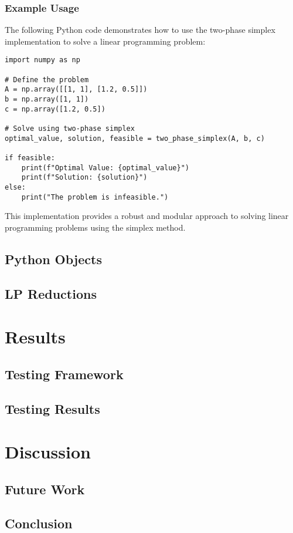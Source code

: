 \documentclass[conference]{IEEEtran}
\begin{document}
\subsubsection{Example Usage}
The following Python code demonstrates how to use the two-phase simplex implementation to solve a linear programming problem:
\begin{lstlisting}[style=mypython, caption={Example Usage of Two-Phase Simplex}]
import numpy as np

# Define the problem
A = np.array([[1, 1], [1.2, 0.5]])
b = np.array([1, 1])
c = np.array([1.2, 0.5])

# Solve using two-phase simplex
optimal_value, solution, feasible = two_phase_simplex(A, b, c)

if feasible:
    print(f"Optimal Value: {optimal_value}")
    print(f"Solution: {solution}")
else:
    print("The problem is infeasible.")
\end{lstlisting}

This implementation provides a robust and modular approach to solving linear programming problems using the simplex method.

\subsection{Python Objects}
\label{Objects}

\subsection{LP Reductions}
\label{Reductions}

\section{Results}
\subsection{Testing Framework}

\subsection{Testing Results}


\section{Discussion}
\subsection{Future Work}
\label{future_work}

\subsection{Conclusion}





\end{document}
